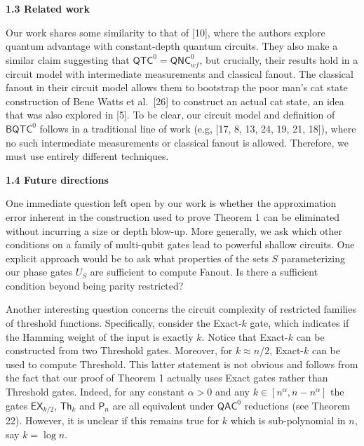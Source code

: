 \par\medskip\noindent\textbf{
1.3 Related work}\par




Our work shares some similarity to that of [10], where the authors explore quantum advantage with constant-depth quantum circuits. They also make a similar claim suggesting that ${\mathsf{QTC}}^{0}={\mathsf{QNC}}^{0}_{wf}$, but crucially, their results hold in a circuit model with intermediate measurements and classical fanout. The classical fanout in their circuit model allows them to bootstrap the poor man’s cat state construction of Bene Watts et al. [26] to construct an actual cat state, an idea that was also explored in [5]. To be clear, our circuit model and definition of ${\mathsf{BQTC}}^{0}$ follows in a traditional line of work (e.g, [17, 8, 13, 24, 19, 21, 18]), where no such intermediate measurements or classical fanout is allowed. Therefore, we must use entirely different techniques.\par





\par\medskip\noindent\textbf{
1.4 Future directions}\par




One immediate question left open by our work is whether the approximation error inherent in the construction used to prove Theorem 1 can be eliminated without incurring a size or depth blow-up.
More generally, we ask which other conditions on a family of multi-qubit gates lead to powerful shallow circuits. One explicit approach would be to ask what properties of the sets $S$ parameterizing our phase gates $U_{S}$ are sufficient to compute Fanout. Is there a sufficient condition beyond being parity restricted?\par




Another interesting question concerns the circuit complexity of restricted families of threshold functions. Specifically, consider the Exact-$k$ gate, which indicates if the Hamming weight of the input is exactly $k$. Notice that Exact-$k$ can be constructed from two Threshold gates. Moreover, for $k\approx n/2$, Exact-$k$ can be used to compute Threshold. This latter statement is not obvious and follows from the fact that our proof of Theorem 1 actually uses Exact gates rather than Threshold gates. Indeed, for any constant $\alpha>0$ and any $k\in[n^{\alpha},n-n^{\alpha}]$ the gates $\mathsf{EX}_{k/2}$, $\mathsf{Th}_{k}$ and $\mathsf{P}_{n}$ are all equivalent under ${\mathsf{QAC}}^{0}$ reductions (see Theorem 22). However, it is unclear if this remains true for $k$ which is sub-polynomial in $n$, say $k=\log{n}$.\par






